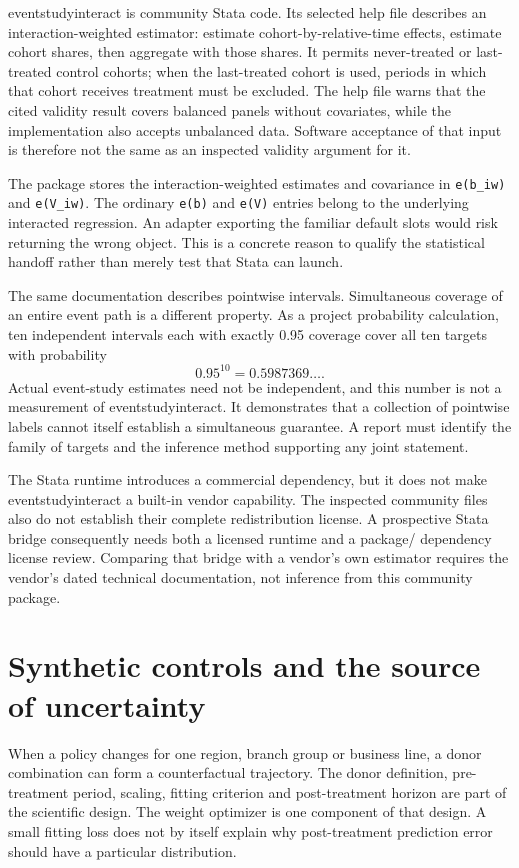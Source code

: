 eventstudyinteract is community Stata code. Its selected help file describes
an interaction-weighted estimator: estimate cohort-by-relative-time effects,
estimate cohort shares, then aggregate with those shares. It permits
never-treated or last-treated control cohorts; when the last-treated cohort
is used, periods in which that cohort receives treatment must be excluded.
The help file warns that the cited validity result covers balanced panels
without covariates, while the implementation also accepts unbalanced data.
Software acceptance of that input is therefore not the same as an inspected
validity argument for it.\cite{v12_sw_eventstudyinteract}

The package stores the interaction-weighted estimates and covariance in
\texttt{e(b\_iw)} and \texttt{e(V\_iw)}. The ordinary \texttt{e(b)} and
\texttt{e(V)} entries belong to the underlying interacted regression. An
adapter exporting the familiar default slots would risk returning the wrong
object. This is a concrete reason to qualify the statistical handoff rather
than merely test that Stata can launch.

The same documentation describes pointwise intervals. Simultaneous coverage
of an entire event path is a different property. As a project probability
calculation, ten independent intervals each with exactly 0.95 coverage cover
all ten targets with probability
\[
 0.95^{10}=0.5987369\ldots.
\]
Actual event-study estimates need not be independent, and this number is not
a measurement of eventstudyinteract. It demonstrates that a collection of
pointwise labels cannot itself establish a simultaneous guarantee. A report
must identify the family of targets and the inference method supporting any
joint statement.

The Stata runtime introduces a commercial dependency, but it does not make
eventstudyinteract a built-in vendor capability. The inspected community files
also do not establish their complete redistribution license. A prospective
Stata bridge consequently needs both a licensed runtime and a package/
dependency license review. Comparing that bridge with a vendor's own estimator
requires the vendor's dated technical documentation, not inference from this
community package.

\section{Synthetic controls and the source of uncertainty}

When a policy changes for one region, branch group or business line, a donor
combination can form a counterfactual trajectory. The donor definition,
pre-treatment period, scaling, fitting criterion and post-treatment horizon
are part of the scientific design. The weight optimizer is one component of
that design. A small fitting loss does not by itself explain why post-treatment
prediction error should have a particular distribution.

